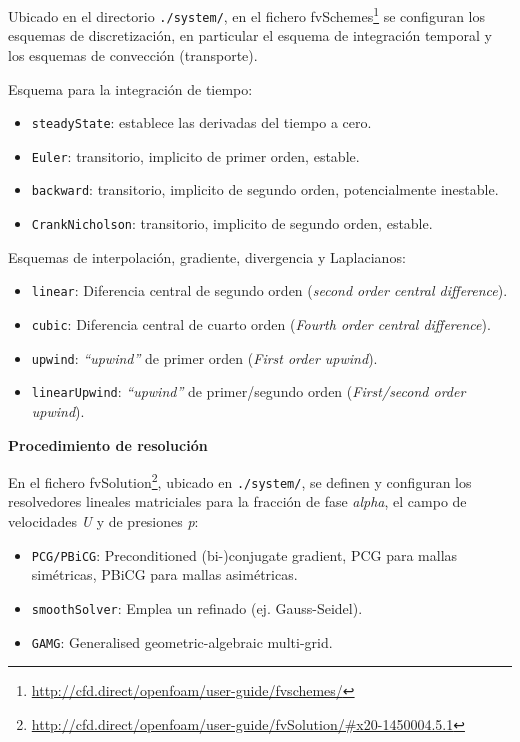Ubicado en el directorio \lstinline[style=bash]{./system/}, en el
fichero fvSchemes\footnote{\url{http://cfd.direct/openfoam/user-guide/fvschemes/}} se
configuran los esquemas de discretización, en particular el esquema de
integración temporal y los esquemas de convección (transporte).

Esquema para la integración de tiempo:

\begin{itemize}
\item
  \texttt{steadyState}: establece las derivadas del tiempo a cero.
\item
  \texttt{Euler}: transitorio, implicito de primer orden, estable.
\item
  \texttt{backward}: transitorio, implicito de segundo orden,
  potencialmente inestable.
\item
  \texttt{CrankNicholson}: transitorio, implicito de segundo orden,
  estable.
\end{itemize}

Esquemas de interpolación, gradiente, divergencia y Laplacianos:

\begin{itemize}
\item
  \texttt{linear}: Diferencia central de segundo orden (\emph{second
  order central difference}).
\item
  \texttt{cubic}: Diferencia central de cuarto orden (\emph{Fourth order
  central difference}).
\item
  \texttt{upwind}: \emph{``upwind''} de primer orden (\emph{First order
  upwind}).
\item
  \texttt{linearUpwind}: \emph{``upwind''} de primer/segundo orden
  (\emph{First/second order upwind}).
\end{itemize}

\textbf{Procedimiento de resolución}

En el fichero fvSolution\footnote{\url{http://cfd.direct/openfoam/user-guide/fvSolution/\#x20-1450004.5.1}},
ubicado en \lstinline[style=bash]{./system/}, se definen y configuran
los resolvedores lineales matriciales para la fracción de fase
\emph{alpha}, el campo de velocidades \emph{U} y de presiones \emph{p}:

\begin{itemize}
\item
  \texttt{PCG/PBiCG}: Preconditioned (bi-)conjugate gradient, PCG para
  mallas simétricas, PBiCG para mallas asimétricas.
\item
  \texttt{smoothSolver}: Emplea un refinado (ej. Gauss-Seidel).
\item
  \texttt{GAMG}: Generalised geometric-algebraic multi-grid.
\end{itemize}

